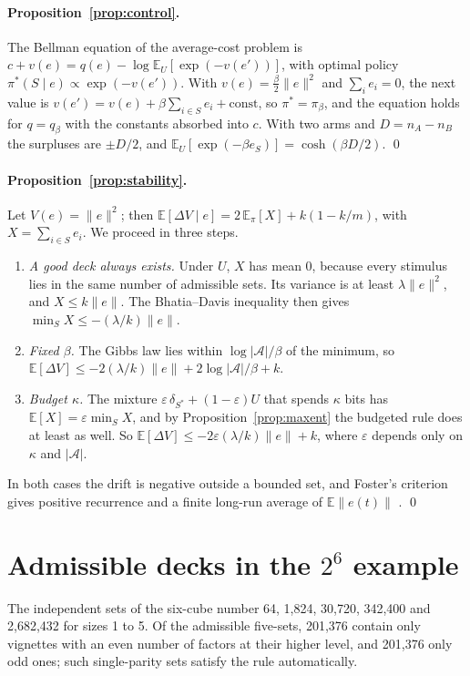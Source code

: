 \documentclass[11pt]{article}
\newcommand{\A}{\mathcal{A}}
\newcommand{\Unif}{U}
\newcommand{\E}{\mathbb{E}}
\begin{document}
\paragraph{Proposition~\ref{prop:control}.} The Bellman equation of the average-cost problem \citep{todorov2009} is $c+v(e)=q(e)-\log\E_{\Unif}[\exp(-v(e'))]$, with optimal policy $\pi^*(S\mid e)\propto\exp(-v(e'))$. With $v(e)=\frac{\beta}{2}\|e\|^2$ and $\sum_i e_i=0$, the next value is $v(e')=v(e)+\beta\sum_{i\in S}e_i+\text{const}$, so $\pi^*=\pi_\beta$, and the equation holds for $q=q_\beta$ with the constants absorbed into $c$. With two arms and $D=n_A-n_B$ the surpluses are $\pm D/2$, and $\E_{\Unif}[\exp(-\beta e_S)]=\cosh(\beta D/2)$. \qed

\paragraph{Proposition~\ref{prop:stability}.} Let $V(e)=\|e\|^2$; then $\E[\Delta V\mid e]=2\,\E_\pi[X]+k(1-k/m)$, with $X=\sum_{i\in S}e_i$. We proceed in three steps.
\begin{enumerate}
\item \emph{A good deck always exists.} Under $\Unif$, $X$ has mean 0, because every stimulus lies in the same number of admissible sets. Its variance is at least $\lambda\|e\|^2$, and $X\le k\|e\|$. The Bhatia--Davis inequality then gives $\min_S X\le-(\lambda/k)\|e\|$.
\item \emph{Fixed $\beta$.} The Gibbs law lies within $\log|\A|/\beta$ of the minimum, so $\E[\Delta V]\le-2(\lambda/k)\|e\|+2\log|\A|/\beta+k$.
\item \emph{Budget $\kappa$.} The mixture $\varepsilon\,\delta_{S^*}+(1-\varepsilon)\Unif$ that spends $\kappa$ bits has $\E[X]=\varepsilon\min_S X$, and by Proposition~\ref{prop:maxent} the budgeted rule does at least as well. So $\E[\Delta V]\le-2\varepsilon(\lambda/k)\|e\|+k$, where $\varepsilon$ depends only on $\kappa$ and $|\A|$.
\end{enumerate}
In both cases the drift is negative outside a bounded set, and Foster's criterion gives positive recurrence and a finite long-run average of $\E\|e(t)\|$ \citep{meyn2009}. \qed

\section{Admissible decks in the \texorpdfstring{$2^6$}{2\^{}6} example}\label{app:decks}

The independent sets of the six-cube number 64, 1,824, 30,720, 342,400 and 2,682,432 for sizes 1 to 5. Of the admissible five-sets, 201,376 contain only vignettes with an even number of factors at their higher level, and 201,376 only odd ones; such single-parity sets satisfy the rule automatically.
\end{document}
